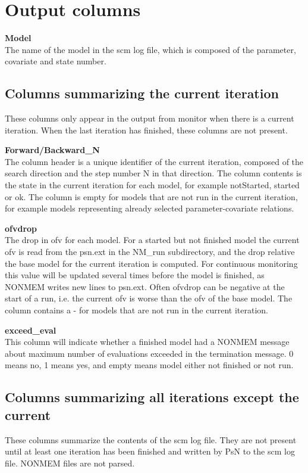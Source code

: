 \section{Output columns}
{\bfseries Model}\\
The name of the model in the scm log file, which is composed of the parameter, covariate and state number.

\subsection{Columns summarizing the current iteration}
These columns only appear in the output from monitor when there is a current iteration. 
When the last iteration has finished, these columns are not present.

{\bfseries Forward/Backward\_N} \\
The column header is a unique identifier of the current iteration, composed of the search direction and the step number N in that direction. The column contents is the state in the current iteration 
for each model, for example notStarted, started or ok. 
The column is empty for models that are not run in the current iteration, for example models
representing already selected parameter-covariate relations.

{\bfseries ofvdrop}\\
The drop in ofv for each model. For a started but not finished model the current ofv is read from 
the psn.ext in the NM\_run subdirectory, and the drop relative the base model for the current iteration
is computed. For continuous monitoring this value will be updated several
times before the model is finished, as NONMEM writes new lines to psn.ext. 
Often ofvdrop can be negative at the start of a run, i.e. the current ofv is 
worse than the ofv of the base model. 
The column contains a - for models that are not run in the current iteration.

{\bfseries exceed\_eval}\\
This column will indicate whether a finished model had a NONMEM message about maximum number
of evaluations exceeded in the termination message. 0 means no, 1 means yes, and empty means
model either not finished or not run.

\subsection{Columns summarizing all iterations except the current}
These columns summarize the contents of the scm log file. 
They are not present until at least one iteration has been finished and written by PsN
to the scm log file.
NONMEM files are not parsed.

